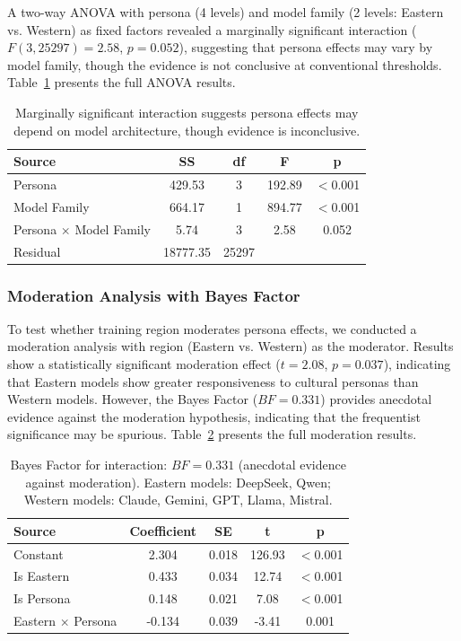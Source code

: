 \documentclass{article}
\begin{document}
A two-way ANOVA with persona (4 levels) and model family (2 levels: Eastern vs. Western) as fixed factors revealed a marginally significant interaction ($F(3, 25297) = 2.58$, $p = 0.052$), suggesting that persona effects may vary by model family, though the evidence is not conclusive at conventional thresholds. Table~\ref{tab:anova_novelty} presents the full ANOVA results.

\begin{table}[H]
\centering
\caption{Two-Way ANOVA Results for Novelty (Persona $\times$ Model Family)}
\label{tab:anova_novelty}
\begin{tabular}{lcccc}
\toprule
Source & SS & df & F & p \\
\midrule
Persona & 429.53 & 3 & 192.89 & $<$0.001 \\
Model Family & 664.17 & 1 & 894.77 & $<$0.001 \\
Persona $\times$ Model Family & 5.74 & 3 & 2.58 & 0.052 \\
Residual & 18777.35 & 25297 & & \\
\bottomrule
\end{tabular}
\caption*{\footnotesize Marginally significant interaction suggests persona effects may depend on model architecture, though evidence is inconclusive.}
\end{table}

\subsubsection{Moderation Analysis with Bayes Factor}

To test whether training region moderates persona effects, we conducted a moderation analysis with region (Eastern vs. Western) as the moderator. Results show a statistically significant moderation effect ($t = 2.08$, $p = 0.037$), indicating that Eastern models show greater responsiveness to cultural personas than Western models. However, the Bayes Factor ($BF = 0.331$) provides anecdotal evidence against the moderation hypothesis, indicating that the frequentist significance may be spurious. Table~\ref{tab:moderation_novelty} presents the full moderation results.

\begin{table}[H]
\centering
\caption{Moderation Analysis for Novelty (Training Region $\times$ Persona)}
\label{tab:moderation_novelty}
\begin{tabular}{lcccc}
\toprule
Source & Coefficient & SE & t & p \\
\midrule
Constant & 2.304 & 0.018 & 126.93 & $<$0.001 \\
Is Eastern & 0.433 & 0.034 & 12.74 & $<$0.001 \\
Is Persona & 0.148 & 0.021 & 7.08 & $<$0.001 \\
Eastern $\times$ Persona & -0.134 & 0.039 & -3.41 & 0.001 \\
\bottomrule
\end{tabular}
\caption*{\footnotesize Bayes Factor for interaction: $BF = 0.331$ (anecdotal evidence against moderation). Eastern models: DeepSeek, Qwen; Western models: Claude, Gemini, GPT, Llama, Mistral.}
\end{table}
\end{document}
